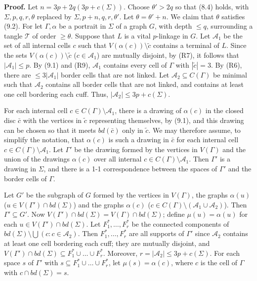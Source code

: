 \textbf{Proof.} Let $n = 3p + 2q(3p + c(\Sigma))$. Choose $\theta' > 2q$ so that (8.4) holds, with $\Sigma, p, q, r, \theta$ replaced by $\Sigma, p + n, q, r, \theta'$. Let $\theta = \theta' + n$. We claim that $\theta$ satisfies (9.2). For let $\Gamma, \alpha$ be a portrait in $\Sigma$ of a graph $G$, with depth $\le q$, surrounding a tangle $\mathcal{T}$ of order $\ge \theta$. Suppose that $L$ is a vital $p$-linkage in $G$. Let $\mathcal{A}_1$ be the set of all internal cells $c$ such that $V(\alpha(c)) \setminus \tilde{c}$ contains a terminal of $L$. Since the sets $V(\alpha(c)) \setminus \tilde{c}$ ($c \in \mathcal{A}_1$) are mutually disjoint, by (R7), it follows that $|\mathcal{A}_1| \le p$. By (9.1) and (R9), $\mathcal{A}_1$ contains every cell of $\Gamma$ with $|\tilde{c}| = 3$. By (R6), there are $\le 3|\mathcal{A}_1|$ border cells that are not linked. Let $\mathcal{A}_2 \subseteq C(\Gamma)$ be minimal such that $\mathcal{A}_2$ contains all border cells that are not linked, and contains at least one cell bordering each cuff. Thus, $|\mathcal{A}_2| \le 3p + c(\Sigma)$.

For each internal cell $c \in C(\Gamma) \setminus \mathcal{A}_1$, there is a drawing of $\alpha(c)$ in the closed disc $\bar{c}$ with the vertices in $\tilde{c}$ representing themselves, by (9.1), and this drawing can be chosen so that it meets $bd(\bar{c})$ only in $\tilde{c}$. We may therefore assume, to simplify the notation, that $\alpha(c)$ is such a drawing in $\bar{c}$ for each internal cell $c \in C(\Gamma) \setminus \mathcal{A}_1$. Let $\Gamma'$ be the drawing formed by the vertices in $V(\Gamma)$ and the union of the drawings $\alpha(c)$ over all internal $c \in C(\Gamma) \setminus \mathcal{A}_1$. Then $\Gamma'$ is a drawing in $\Sigma$, and there is a 1-1 correspondence between the spaces of $\Gamma'$ and the border cells of $\Gamma$.

Let $G'$ be the subgraph of $G$ formed by the vertices in $V(\Gamma)$, the graphs $\alpha(u)$ ($u \in V(\Gamma') \cap bd(\Sigma)$) and the graphs $\alpha(c)$ ($c \in C(\Gamma) \setminus (\mathcal{A}_1 \cup \mathcal{A}_2)$). Then $\Gamma' \subseteq G'$. Now $V(\Gamma') \cap bd(\Sigma) = V(\Gamma) \cap bd(\Sigma)$; define $\mu(u) = \alpha(u)$ for each $u \in V(\Gamma') \cap bd(\Sigma)$. Let $F_1^*, \dots, F_r^*$ be the connected components of $bd(\Sigma) \setminus \bigcup(c : c \in \mathcal{A}_2)$. Then $F_1^*, \dots, F_r^*$ are all supports of $\Gamma'$ since $\mathcal{A}_2$ contains at least one cell bordering each cuff; they are mutually disjoint, and $V(\Gamma') \cap bd(\Sigma) \subseteq F_1^* \cup \dots \cup F_r^*$. Moreover, $r = |\mathcal{A}_2| \le 3p + c(\Sigma)$. For each space $s$ of $\Gamma'$ with $s \subseteq F_1^* \cup \dots \cup F_r^*$, let $\mu(s) = \alpha(c)$, where $c$ is the cell of $\Gamma$ with $c \cap bd(\Sigma) = s$.

